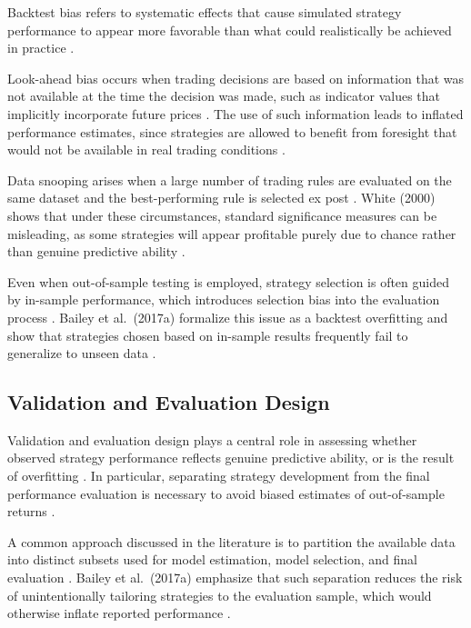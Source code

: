 Backtest bias refers to systematic effects that cause simulated strategy
performance to appear more favorable than what could realistically be achieved
in practice \citep{bailey2017probability}.

Look-ahead bias occurs when trading decisions are based on information that was
not available at the time the decision was made, such as indicator values that
implicitly incorporate future prices \citep{bailey2017probability}. The use of
such information leads to inflated performance estimates, since strategies are
allowed to benefit from foresight that would not be available in real trading
conditions \citep{bailey2017probability}.

Data snooping arises when a large number of trading rules are evaluated on the
same dataset and the best-performing rule is selected ex post
\citep{white2000reality}. White (2000) shows that under these circumstances,
standard significance measures can be misleading, as some strategies will
appear profitable purely due to chance rather than genuine predictive ability
\citep{white2000reality}.

Even when out-of-sample testing is employed, strategy selection is often guided
by in-sample performance, which introduces selection bias into the evaluation
process \citep{bailey2017probability}. Bailey et al.~(2017a) formalize this issue
as a backtest overfitting and show that strategies chosen based on in-sample
results frequently fail to generalize to unseen data \citep{bailey2017probability}.

\subsection{Validation and Evaluation Design}

Validation and evaluation design plays a central role in assessing whether
observed strategy performance reflects genuine predictive ability, or is the
result of overfitting \citep{bailey2017probability}. In particular, separating
strategy development from the final performance evaluation is necessary to avoid
biased estimates of out-of-sample returns \citep{bailey2017probability}.

A common approach discussed in the literature is to partition the available
data into distinct subsets used for model estimation, model selection, and
final evaluation \citep{bailey2017probability}. Bailey et al.~(2017a) emphasize
that such separation reduces the risk of unintentionally tailoring strategies
to the evaluation sample, which would otherwise inflate reported performance
\citep{bailey2017probability}.

